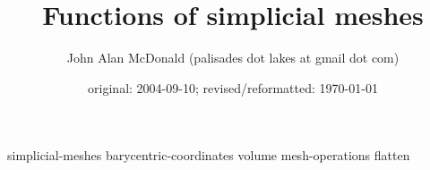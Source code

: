 \documentclass{PalisadesLakesArticle}
\title{Functions of simplicial meshes}
\author{John Alan McDonald (palisades dot lakes at gmail dot com)}
\date{original: 2004-09-10; revised/reformatted: \today}
\begin{document}
\maketitle
\def\sharedFolder{../../shared/}

{simplicial-meshes}
{barycentric-coordinates}
{volume}
{mesh-operations}
{flatten}

\appendix




\end{document}
